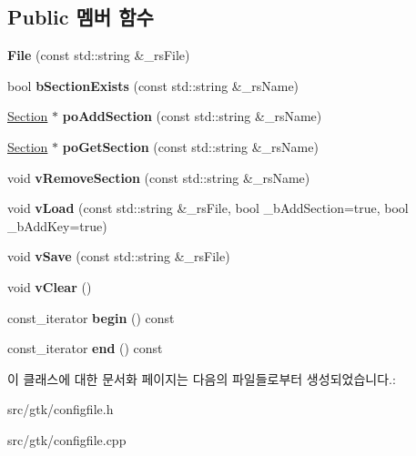 \subsection*{Public 멤버 함수}
\begin{DoxyCompactItemize}
\item 
\mbox{\label{class_v_b_a_1_1_config_1_1_file_a5f76dd130a9c0eff526dfd0fbeaa9e44}} 
{\bfseries File} (const std\+::string \&\+\_\+rs\+File)
\item 
\mbox{\label{class_v_b_a_1_1_config_1_1_file_a1c449716812ae76ece9dd315a89da8ff}} 
bool {\bfseries b\+Section\+Exists} (const std\+::string \&\+\_\+rs\+Name)
\item 
\mbox{\label{class_v_b_a_1_1_config_1_1_file_a8a785523724a50c1d40a50ea6ada6a4c}} 
\mbox{\hyperlink{class_v_b_a_1_1_config_1_1_section}{Section}} $\ast$ {\bfseries po\+Add\+Section} (const std\+::string \&\+\_\+rs\+Name)
\item 
\mbox{\label{class_v_b_a_1_1_config_1_1_file_a0de8f36155786c73b91a22e62df27958}} 
\mbox{\hyperlink{class_v_b_a_1_1_config_1_1_section}{Section}} $\ast$ {\bfseries po\+Get\+Section} (const std\+::string \&\+\_\+rs\+Name)
\item 
\mbox{\label{class_v_b_a_1_1_config_1_1_file_a4b9de49a799dc1e4de38710669127710}} 
void {\bfseries v\+Remove\+Section} (const std\+::string \&\+\_\+rs\+Name)
\item 
\mbox{\label{class_v_b_a_1_1_config_1_1_file_ac70f83e5efe3c2d7a66de7227099803b}} 
void {\bfseries v\+Load} (const std\+::string \&\+\_\+rs\+File, bool \+\_\+b\+Add\+Section=true, bool \+\_\+b\+Add\+Key=true)
\item 
\mbox{\label{class_v_b_a_1_1_config_1_1_file_a95ce8b60e20b58e730d9987843cba5a4}} 
void {\bfseries v\+Save} (const std\+::string \&\+\_\+rs\+File)
\item 
\mbox{\label{class_v_b_a_1_1_config_1_1_file_aab1ab602f9eafb2ea1cd981a2953756d}} 
void {\bfseries v\+Clear} ()
\item 
\mbox{\label{class_v_b_a_1_1_config_1_1_file_a4dd88e6aa71829ce332139028225efcf}} 
const\+\_\+iterator {\bfseries begin} () const
\item 
\mbox{\label{class_v_b_a_1_1_config_1_1_file_a809724e386bf59c8726c33e822890c70}} 
const\+\_\+iterator {\bfseries end} () const
\end{DoxyCompactItemize}


이 클래스에 대한 문서화 페이지는 다음의 파일들로부터 생성되었습니다.\+:\begin{DoxyCompactItemize}
\item 
src/gtk/configfile.\+h\item 
src/gtk/configfile.\+cpp\end{DoxyCompactItemize}
